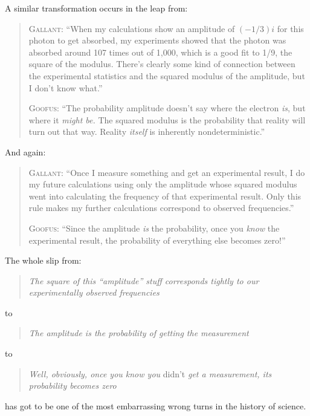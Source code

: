 {
 A similar transformation occurs in the leap from:}

\begin{quotation}
{
 \textsc{Gallant}: ``When my calculations show an amplitude
of $(-1/3)i$ for this photon to get absorbed, my experiments showed
that the photon was absorbed around 107 times out of 1,000, which is a
good fit to 1/9, the square of the modulus. There's
clearly some kind of connection between the experimental statistics and
the squared modulus of the amplitude, but I don't know
what.''}

{
 \textsc{Goofus}: ``The probability amplitude
doesn't say where the electron \textit{is}, but where
it \textit{might be.} The squared modulus is the probability that
reality will turn out that way. Reality \textit{itself} is inherently
nondeterministic.''}
\end{quotation}

{
 And again:}

\begin{quotation}
{
 \textsc{Gallant}: ``Once I measure something and get an
experimental result, I do my future calculations using only the
amplitude whose squared modulus went into calculating the frequency of
that experimental result. Only this rule makes my further calculations
correspond to observed frequencies.''}

{
 \textsc{Goofus}: ``Since the amplitude \textit{is} the
probability, once you \textit{know} the experimental result, the
probability of everything else becomes zero!''}
\end{quotation}

{
 The whole slip from:}

\begin{quote}
{
 \textit{The square of this
``amplitude'' stuff corresponds
   tightly to our experimentally observed frequencies}}
\end{quote}

{
 to}

\begin{quote}
{
 \textit{The amplitude is the probability of getting the
   measurement}}
\end{quote}

{
 to}

\begin{quote}
{
 \textit{Well, obviously, once you know you} didn't
 \textit{get a measurement, its probability becomes zero}}
\end{quote}

{
 has got to be one of the most embarrassing wrong turns in the
history of science.}

